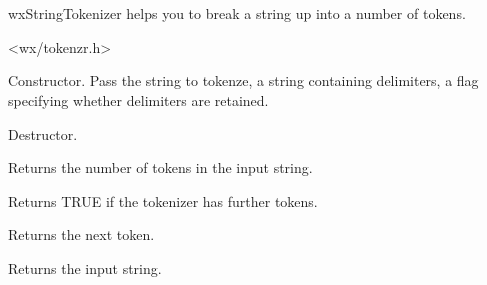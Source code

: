 \section{}\label{wxstringtokenizer}

wxStringTokenizer helps you to break a string up into a number of tokens.




<wx/tokenzr.h>


\label{wxstringtokenizerwxstringtokenizer}


Constructor. Pass the string to tokenze, a string containing delimiters,
a flag specifying whether delimiters are retained.

\label{wxstringtokenizerdtor}


Destructor.

\label{wxstringtokenizercounttokens}


Returns the number of tokens in the input string.

\label{wxstringtokenizerhasmoretoken}


Returns TRUE if the tokenizer has further tokens.

\label{wxstringtokenizernexttoken}


Returns the next token.

\label{wxstringtokenizergetstring}


Returns the input string.



